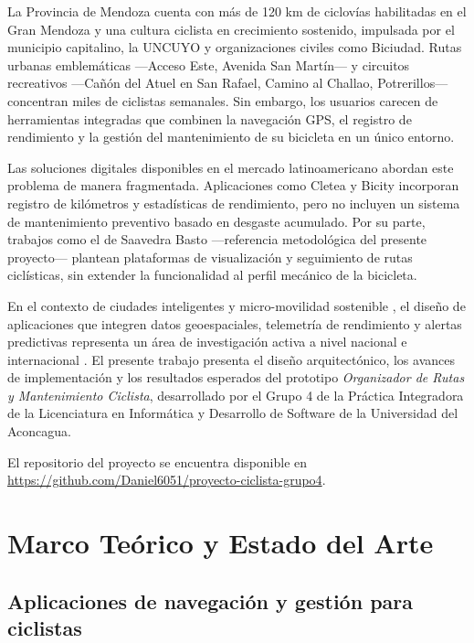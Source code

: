 \documentclass{llncs}
\begin{document}
La Provincia de Mendoza cuenta con más de 120 km de ciclovías habilitadas en el Gran Mendoza y una cultura ciclista en crecimiento sostenido, impulsada por el municipio capitalino, la UNCUYO y organizaciones civiles como Biciudad. Rutas urbanas emblemáticas —Acceso Este, Avenida San Martín— y circuitos recreativos —Cañón del Atuel en San Rafael, Camino al Challao, Potrerillos— concentran miles de ciclistas semanales. Sin embargo, los usuarios carecen de herramientas integradas que combinen la navegación GPS, el registro de rendimiento y la gestión del mantenimiento de su bicicleta en un único entorno.

Las soluciones digitales disponibles en el mercado latinoamericano abordan este problema de manera fragmentada. Aplicaciones como Cletea \cite{Calderon2022} y Bicity \cite{Avalos2021} incorporan registro de kilómetros y estadísticas de rendimiento, pero no incluyen un sistema de mantenimiento preventivo basado en desgaste acumulado. Por su parte, trabajos como el de Saavedra Basto \cite{Saavedra2022} —referencia metodológica del presente proyecto— plantean plataformas de visualización y seguimiento de rutas ciclísticas, sin extender la funcionalidad al perfil mecánico de la bicicleta.

En el contexto de ciudades inteligentes y micro-movilidad sostenible \cite{Rodriguez2025}, el diseño de aplicaciones que integren datos geoespaciales, telemetría de rendimiento y alertas predictivas representa un área de investigación activa a nivel nacional e internacional \cite{Alves2025,Boronat2021}. El presente trabajo presenta el diseño arquitectónico, los avances de implementación y los resultados esperados del prototipo \textit{Organizador de Rutas y Mantenimiento Ciclista}, desarrollado por el Grupo 4 de la Práctica Integradora de la Licenciatura en Informática y Desarrollo de Software de la Universidad del Aconcagua.

El repositorio del proyecto se encuentra disponible en \url{https://github.com/Daniel6051/proyecto-ciclista-grupo4}.

\section{Marco Teórico y Estado del Arte}

\subsection{Aplicaciones de navegación y gestión para ciclistas}
\end{document}
